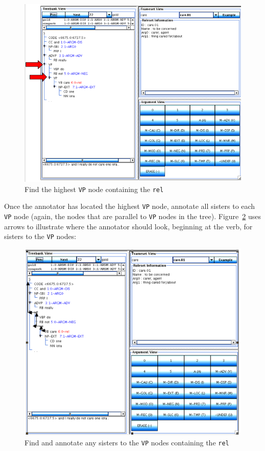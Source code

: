 \documentclass[11pt]{report}
\begin{document}
\begin{figure}[htbp]
\centering
\includegraphics[scale=0.4]{img/VPArrows.png}
\caption{Find the highest \texttt{VP} node containing the \texttt{rel}}
\label{fig:VPArrows}
\end{figure}

Once the annotator has located the highest \texttt{VP} node, annotate all sisters to each \texttt{VP} node (again, the nodes that are parallel to \texttt{VP} nodes in the tree). Figure~\ref{fig:spanArrows} uses arrows to illustrate where the annotator should look, beginning at the verb, for sisters to the \texttt{VP} nodes: 

\begin{figure}[htbp]
\centering
\includegraphics[scale=0.4]{img/spanArrows.png}
\caption{Find and annotate any sisters to the \texttt{VP} nodes containing the \texttt{rel}}
\label{fig:spanArrows}
\end{figure}
\end{document}
